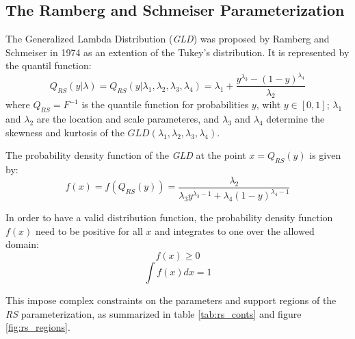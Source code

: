\subsection{The Ramberg and Schmeiser Parameterization}\label{sec:rs_gld}
The Generalized Lambda Distribution (\textit{GLD}) was proposed by Ramberg and Schmeiser in 1974 as an extention of the Tukey's distribution. It is represented by the quantil function:
\begin{equation}\label{eq:rs_param}
Q_{RS}(y|\lambda)=Q_{RS}(y|\lambda_{1}, \lambda_{2}, \lambda_{3}, \lambda_{4})=\lambda_{1}+\frac{y^{\lambda_{3}}-(1-y)^{\lambda_{4}}}{\lambda_{2}}
\end{equation}
where $Q_{RS}=F^{-1}$ is the quantile function for probabilities $y$, wiht $y\in[0,1]$; $\lambda_{1}$ and $\lambda_{2}$ are the location and scale parameteres, and $\lambda_{3}$ and $\lambda_{4}$ determine the skewness and kurtosis of the $GLD(\lambda_{1}, \lambda_{2}, \lambda_{3}, \lambda_{4})$.

The probability density function of the \textit{GLD} at the point $x=Q_{RS}(y)$ is given by:
\begin{equation}\label{eq:rs_pdf}
f(x)=f(Q_{RS}(y))=\frac{\lambda_{2}}{\lambda_{3}y^{\lambda_{3}-1}+\lambda_{4}(1-y)^{\lambda_{4}-1}}
\end{equation}

In order to have a valid distribution function, the probability density function $f(x)$ need to be positive for all $x$ and integrates to one over the allowed domain:
\begin{equation}
f(x) \geqslant 0
\end{equation}
\begin{equation}
\int f(x)dx=1
\end{equation}

This impose complex constraints on the parameters and support regions of the \textit{RS} parameterization, as summarized in table \ref{tab:rs_conts} and figure \ref{fig:rs_regions}.

